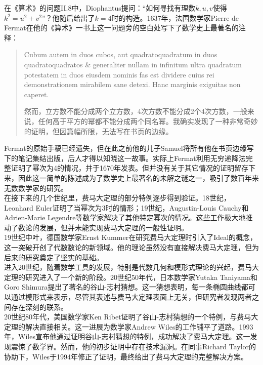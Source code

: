 \documentclass{article}
\begin{document}
\noindent
在《算术》的问题II.8中，Diophantus提问：“如何寻找有理数$k,u,v$使得$k^2=u^2+v^2$”？他随后给出了$k=4$时的构造。1637年，法国数学家Pierre de Fermat在他的《算术》一书上这一问题旁的空白处写下了数学史上最著名的注释：

\begin{quote}
Cubum autem in duos cubos, aut quadratoquadratum in duos quadratoquadratos \& generaliter nullam in infinitum ultra quadratum potestatem in duos eiusdem nominis fas est dividere cuius rei demonstrationem mirabilem sane detexi. Hanc marginis exiguitas non caperet. 

然而，立方数不能分成两个立方数，4次方数不能分成2个4次方数，一般来说，任何高于平方的幂都不能分成两个同名幂。我确实发现了一种非常奇妙的证明，但因篇幅所限，无法写在书页的边缘。
\end{quote}

\noindent
Fermat的原始手稿已经遗失，但在此之前他的儿子Samuel将所有他在书页边缘写下的笔记集结出版，后人才得以知晓这一故事。实际上Fermat利用无穷递降法完整证明了幂次为4的情况，并于1670年发表。但并没有关于其它情况的证明留存下来，因此这一简单的陈述成为了数学史上最著名的未解之谜之一，吸引了数百年来无数数学家的研究。\\

\noindent
在接下来的几个世纪里，费马大定理的部分特例逐步得到验证。18世纪，Leonhard Euler证明了当幂次为3时的情形；19世纪，Augustin-Louis Cauchy和Adrien-Marie Legendre等数学家解决了其他特定幂次的情况。这些工作极大地推动了数论的发展，但并未能实现费马大定理的一般性证明。\\

\noindent
19世纪中叶，德国数学家Ernst Kummer在研究费马大定理时引入了Ideal的概念，这一突破开创了代数数论的新领域。他的理论虽然没有直接解决费马大定理，但为后来的研究奠定了坚实的基础。\\

\noindent
进入20世纪，随着数学工具的发展，特别是代数几何和模形式理论的兴起，费马大定理的研究进入了一个新的阶段。20世纪50年代，日本数学家Yutaka Taniyama和Goro Shimura提出了著名的谷山-志村猜想。这一猜想表明，每一条椭圆曲线都可以通过模形式来表示，尽管其表述与费马大定理表面上无关，但研究者发现两者之间存在深刻的联系。\\

\noindent
20世纪80年代，美国数学家Ken Ribet证明了谷山-志村猜想的一个特例，与费马大定理的解决直接相关。这一进展为数学家Andrew Wiles的工作铺平了道路。1993年，Wiles宣布他通过证明谷山-志村猜想的特例，成功解决了费马大定理。这一发现震惊了数学界。然而，他的初步证明中存在技术漏洞。在同事Richard Taylor的协助下，Wiles于1994年修正了证明，最终给出了费马大定理的完整解决方案。\\
\end{document}
